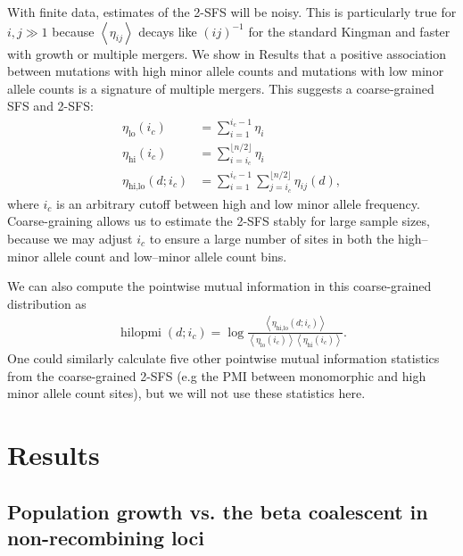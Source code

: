 \documentclass[11pt, letterpaper]{article}   	%
\newcommand{\floor}[1]{\lfloor #1 \rfloor}
\newcommand{\E}[1]{\left< #1 \right>}
\DeclareMathOperator{\hilopmi}{hilopmi}
\begin{document}
With finite data, estimates of the 2-SFS will be noisy.
This is particularly true for $i,j\gg1$ because $\E{\eta_{ij}}$ decays like $(ij)^{-1}$ for the standard Kingman \autocite{Fu1995} and faster with growth or multiple mergers.
We show in Results that a positive association between mutations with high minor allele counts and mutations with low minor allele counts is a signature of multiple mergers.
This suggests a coarse-grained SFS and 2-SFS:
\begin{align}
    \eta_{\text{lo}}(i_c) &= \sum_{i=1}^{i_c-1} \eta_i \\
    \eta_{\text{hi}}(i_c) &= \sum_{i=i_c}^{\floor{n/2}} \eta_i \\
    \eta_{\text{hi,lo}}(d; i_c) &= \sum_{i=1}^{i_c-1} \sum_{j=i_c}^{\floor{n/2}} \eta_{ij}(d),
\end{align}
where $i_c$ is an arbitrary cutoff between high and low minor allele frequency.
Coarse-graining allows us to estimate the 2-SFS stably for large sample sizes, because we may adjust $i_c$ to ensure a large number of sites in both the high--minor allele count and low--minor allele count bins.

We can also compute the pointwise mutual information in this coarse-grained distribution as
\begin{align}
    \hilopmi(d; i_c) = \log \frac
                                {\E{\eta_{\text{hi,lo}}(d; i_c)}}
                                {\E{\eta_{\text{lo}}(i_c)}  \E{\eta_{\text{hi}}(i_c)}}.
\end{align}
One could similarly calculate five other pointwise mutual information statistics from the coarse-grained 2-SFS (e.g the PMI between monomorphic and high minor allele count sites), but we will not use these statistics here.

\section*{Results \label{sec:results}}

\subsection*{Population growth vs. the beta coalescent in non-recombining loci}
\end{document}
